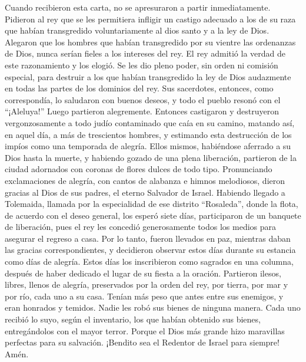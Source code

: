  Cuando recibieron esta carta, no se apresuraron a partir
inmediatamente. Pidieron al rey que se les permitiera infligir un
castigo adecuado a los de su raza que habían transgredido
voluntariamente al dios santo y a la ley de Dios. 
Alegaron que los hombres que habían transgredido por su vientre las
ordenanzas de Dios, nunca serían fieles a los intereses del rey.
 El rey admitió la verdad de este razonamiento y los
elogió. Se les dio pleno poder, sin orden ni comisión especial, para
destruir a los que habían transgredido la ley de Dios audazmente en
todas las partes de los dominios del rey.  Sus
sacerdotes, entonces, como correspondía, lo saludaron con buenos deseos,
y todo el pueblo resonó con el ``¡Aleluya!'' Luego partieron
alegremente.  Entonces castigaron y destruyeron
vergonzosamente a todo judío contaminado que caía en su camino,
 matando así, en aquel día, a más de trescientos hombres,
y estimando esta destrucción de los impíos como una temporada de
alegría.  Ellos mismos, habiéndose aferrado a su Dios
hasta la muerte, y habiendo gozado de una plena liberación, partieron de
la ciudad adornados con coronas de flores dulces de todo tipo.
Pronunciando exclamaciones de alegría, con cantos de alabanza e himnos
melodiosos, dieron gracias al Dios de sus padres, el eterno Salvador de
Israel.  Habiendo llegado a Tolemaida, llamada por la
especialidad de ese distrito ``Rosaleda'', donde la flota, de acuerdo
con el deseo general, los esperó siete días, 
participaron de un banquete de liberación, pues el rey les concedió
generosamente todos los medios para asegurar el regreso a casa.
 Por lo tanto, fueron llevados en paz, mientras daban las
gracias correspondientes, y decidieron observar estos días durante su
estancia como días de alegría.  Estos días los
inscribieron como sagrados en una columna, después de haber dedicado el
lugar de su fiesta a la oración. Partieron ilesos, libres, llenos de
alegría, preservados por la orden del rey, por tierra, por mar y por
río, cada uno a su casa.  Tenían más peso que antes entre
sus enemigos, y eran honrados y temidos. Nadie les robó sus bienes de
ninguna manera.  Cada uno recibió lo suyo, según el
inventario, los que habían obtenido sus bienes, entregándolos con el
mayor terror. Porque el Dios más grande hizo maravillas perfectas para
su salvación.  ¡Bendito sea el Redentor de Israel para
siempre! Amén.
